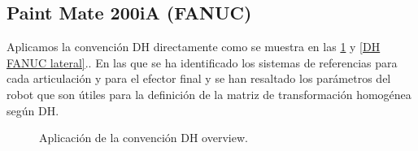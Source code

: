 \documentclass[a4paper,12pt]{article}
\begin{document}
\subsection{Paint Mate 200iA (FANUC)}
\label{subsec: robot 5}

Aplicamos la convención DH directamente como se muestra en las \cref{DH FANUC overview} y \cref{DH FANUC lateral}..
En las que se ha identificado los sistemas de referencias para cada articulación y para el efector final
y se han resaltado los parámetros del robot que son útiles para la definición de la matriz de transformación 
homogénea según DH.

\begin{figure}[H]
    \centering
    \begin{adjustbox}{scale = 0.9, max width=\columnwidth}
    \end{adjustbox}
    \caption{Aplicación de la convención DH overview.}
    \label{DH FANUC overview}
\end{figure}
\end{document}
